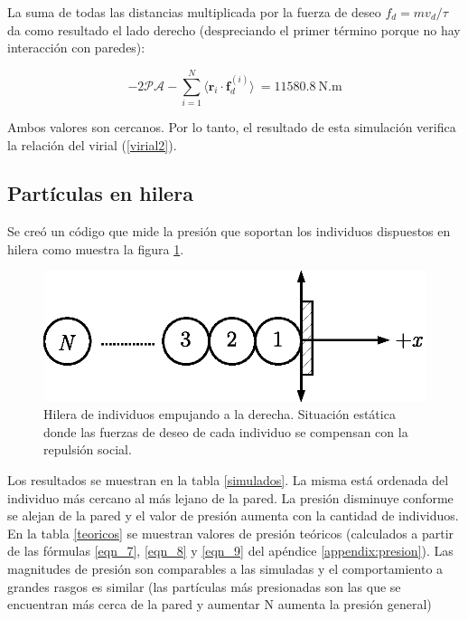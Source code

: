 La suma de todas las distancias multiplicada por la fuerza de deseo $f_d=mv_d/\tau$ da como resultado el lado derecho (despreciando el primer término porque no hay interacción con paredes):

\begin{equation}
 -2\mathcal{PA} -\displaystyle\sum_{i=1}^N \langle
\mathbf{r}_i\cdot\mathbf{f}_d^{(i)}\rangle\ =  11580.8\ \text{N.m}
\end{equation}

Ambos valores son cercanos. Por lo tanto, el resultado de esta simulación verifica la relación del virial (\ref{virial2}).


\subsection{Partículas en hilera}

Se creó un código que mide la presión que soportan los individuos dispuestos en hilera como muestra la figura \ref{hilera}.  

\begin{figure}[!htbp]
\center
\includegraphics[scale=1]{figuras/hilera.eps}
\caption[width=5cm]{Hilera de individuos empujando a la derecha. Situación estática donde las fuerzas de deseo de cada individuo se compensan con la repulsión social.}
\label{hilera}
\end{figure}

Los resultados se muestran en la tabla \ref{simulados}. La misma está ordenada del individuo más cercano al más lejano de la pared. La presión disminuye conforme se alejan de la pared y el valor de presión aumenta con la cantidad de individuos.\\
En la tabla \ref{teoricos} se muestran valores de presión teóricos (calculados a partir de las fórmulas \ref{eqn_7}, \ref{eqn_8} y \ref{eqn_9} del apéndice \ref{appendix:presion}). Las magnitudes de presión son comparables a las simuladas y el comportamiento a grandes rasgos es similar (las partículas más presionadas son las que se encuentran más cerca de la pared y aumentar N aumenta la presión general)  

